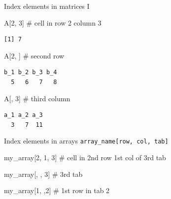 \documentclass[
  ignorenonframetext,
]{beamer}
\newenvironment{Shaded}{\begin{snugshade}}{\end{snugshade}}
\newcommand{\CommentTok}[1]{\textcolor[rgb]{0.54,0.53,0.53}{#1}}
\newcommand{\DecValTok}[1]{\textcolor[rgb]{0.69,0.50,0.00}{#1}}
\newcommand{\NormalTok}[1]{\textcolor[rgb]{0.12,0.11,0.11}{#1}}
\begin{document}
\begin{frame}[fragile]{Index elements in matrices I}
\protect\hypertarget{index-elements-in-matrices-i}{}
\begin{Shaded}
\begin{Highlighting}[]
\NormalTok{A[}\DecValTok{2}\NormalTok{, }\DecValTok{3}\NormalTok{] }\CommentTok{\# cell in row 2 column 3}
\end{Highlighting}
\end{Shaded}

\begin{verbatim}
[1] 7
\end{verbatim}

\begin{Shaded}
\begin{Highlighting}[]
\NormalTok{A[}\DecValTok{2}\NormalTok{, ] }\CommentTok{\# second row}
\end{Highlighting}
\end{Shaded}

\begin{verbatim}
b_1 b_2 b_3 b_4 
  5   6   7   8 
\end{verbatim}

\begin{Shaded}
\begin{Highlighting}[]
\NormalTok{A[, }\DecValTok{3}\NormalTok{] }\CommentTok{\# third column}
\end{Highlighting}
\end{Shaded}

\begin{verbatim}
a_1 a_2 a_3 
  3   7  11 
\end{verbatim}
\end{frame}

\begin{frame}[fragile]{Index elements in arrays}
\protect\hypertarget{index-elements-in-arrays}{}
\texttt{array\_name{[}row,\ col,\ tab{]}}

\begin{Shaded}
\begin{Highlighting}[]
\NormalTok{my\_array[}\DecValTok{2}\NormalTok{, }\DecValTok{1}\NormalTok{, }\DecValTok{3}\NormalTok{] }\CommentTok{\# cell in 2nd row 1st col of 3rd tab}
\end{Highlighting}
\end{Shaded}

\begin{Shaded}
\begin{Highlighting}[]
\NormalTok{my\_array[, , }\DecValTok{3}\NormalTok{] }\CommentTok{\# 3rd tab}

\NormalTok{my\_array[}\DecValTok{1}\NormalTok{, ,}\DecValTok{2}\NormalTok{] }\CommentTok{\# 1st row in tab 2}
\end{Highlighting}
\end{Shaded}
\end{frame}
\end{document}
